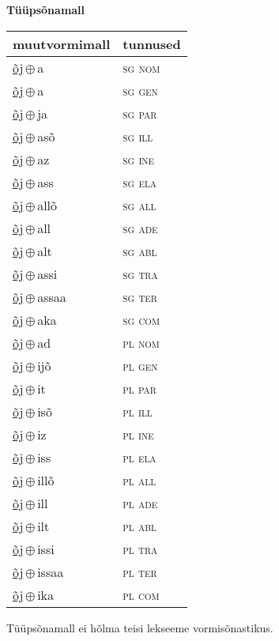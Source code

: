 

\vspace{3.5em}
\noindent \begin{minipage}{\textwidth}
\noindent \textbf{Tüüpsõnamall \,}\\

\begin{sideways}
\begin{tabular}{l l}
muutvormimall & tunnused \\
\hline
\underline{õj}\,$\oplus$\,a & \textsc{ sg nom } \\
\underline{õj}\,$\oplus$\,a & \textsc{ sg gen } \\
\underline{õj}\,$\oplus$\,ja & \textsc{ sg par } \\
\underline{õj}\,$\oplus$\,asõ & \textsc{ sg ill } \\
\underline{õj}\,$\oplus$\,az & \textsc{ sg ine } \\
\underline{õj}\,$\oplus$\,ass & \textsc{ sg ela } \\
\underline{õj}\,$\oplus$\,allõ & \textsc{ sg all } \\
\underline{õj}\,$\oplus$\,all & \textsc{ sg ade } \\
\underline{õj}\,$\oplus$\,alt & \textsc{ sg abl } \\
\underline{õj}\,$\oplus$\,assi & \textsc{ sg tra } \\
\underline{õj}\,$\oplus$\,assaa & \textsc{ sg ter } \\
\underline{õj}\,$\oplus$\,aka & \textsc{ sg com } \\
\underline{õj}\,$\oplus$\,ad & \textsc{ pl nom } \\
\underline{õj}\,$\oplus$\,ijõ & \textsc{ pl gen } \\
\underline{õj}\,$\oplus$\,it & \textsc{ pl par } \\
\underline{õj}\,$\oplus$\,isõ & \textsc{ pl ill } \\
\underline{õj}\,$\oplus$\,iz & \textsc{ pl ine } \\
\underline{õj}\,$\oplus$\,iss & \textsc{ pl ela } \\
\underline{õj}\,$\oplus$\,illõ & \textsc{ pl all } \\
\underline{õj}\,$\oplus$\,ill & \textsc{ pl ade } \\
\underline{õj}\,$\oplus$\,ilt & \textsc{ pl abl } \\
\underline{õj}\,$\oplus$\,issi & \textsc{ pl tra } \\
\underline{õj}\,$\oplus$\,issaa & \textsc{ pl ter } \\
\underline{õj}\,$\oplus$\,ika & \textsc{ pl com } \\
\end{tabular}
\end{sideways}
\label{tab:tüüpsõnamall-õja}

\end{minipage}

 
\vspace{1em}
\noindent Tüüpsõnamall  ei hõlma teisi lekseeme vormi\-sõnastikus.
